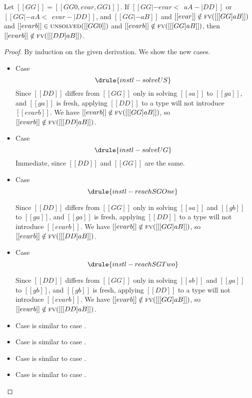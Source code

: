 \begin{lemma}
  Let $[[GG]] = [[  GG0, evar, GG1  ]]$. If $[[ GG |- evar <~~ aA -| DD    ]]$ or $[[  GG |- aA <~~ evar -| DD  ]]$, and $[[ GG |- aB ]]$
  and $[[ evar ]] \notin \textsc{fv}([[ [GG]aB  ]])$ and $[[evarb]] \in \textsc{unsolved}([[GG0]])  $
  and $[[evarb]]  \notin \textsc{fv}([[ [GG]aB  ]])  $,
  then $[[evarb]] \notin \textsc{fv}([[  [DD]aB ]])$.
\end{lemma}
\begin{proof}
  By induction on the given derivation. We show the new cases.
  \begin{itemize}
  \item Case \[  \drule{instl-solveUS}    \]
    Since $[[DD]]$ differs from $[[GG]]$ only in solving $[[sa]]$ to $[[ga]]$, and $[[ga]]$ is fresh,
    applying $[[DD]]$ to a type will not introduce $[[evarb]]$.  We have $[[evarb]]  \notin \textsc{fv}([[ [GG]aB  ]])  $, so
    $[[evarb]]  \notin \textsc{fv}([[ [DD]aB  ]])  $.

  \item Case \[  \drule{instl-solveUG}    \]
    Immediate, since $[[DD]]$ and $[[GG]]$ are the same.

  \item Case \[  \drule{instl-reachSGOne}    \]

    Since $[[DD]]$ differs from $[[GG]]$ only in solving $[[sa]]$ and $[[gb]]$ to $[[ga]]$, and $[[ga]]$ is fresh,
    applying $[[DD]]$ to a type will not introduce $[[evarb]]$.  We have $[[evarb]]  \notin \textsc{fv}([[ [GG]aB  ]])  $, so
    $[[evarb]]  \notin \textsc{fv}([[ [DD]aB  ]])  $.

  \item Case \[  \drule{instl-reachSGTwo}    \]

    Since $[[DD]]$ differs from $[[GG]]$ only in solving $[[sb]]$ and $[[ga]]$ to $[[gb]]$, and $[[gb]]$ is fresh,
    applying $[[DD]]$ to a type will not introduce $[[evarb]]$.  We have $[[evarb]]  \notin \textsc{fv}([[ [GG]aB  ]])  $, so
    $[[evarb]]  \notin \textsc{fv}([[ [DD]aB  ]])  $.

  \item Case  is similar to case .
  \item Case  is similar to case .
  \item Case  is similar to case .
  \item Case  is similar to case .


  \end{itemize}

\end{proof}


